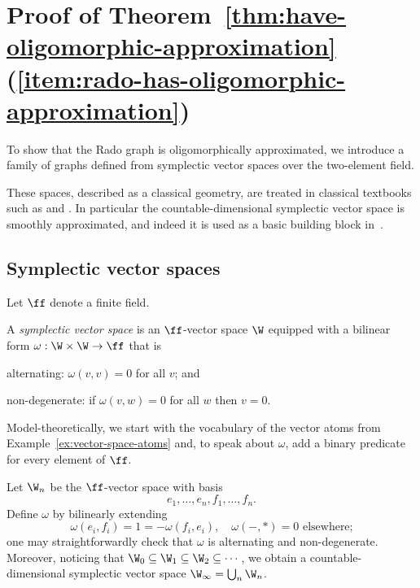 
\section{Proof of Theorem~\ref{thm:have-oligomorphic-approximation}(\ref{item:rado-has-oligomorphic-approximation})}\label{sec:appendix-symplectic}
To show that the Rado graph is oligomorphically approximated, we introduce a family of graphs defined from symplectic vector spaces over the two-element field.

These spaces, described as a classical geometry, are treated in classical textbooks such as \cite[pp.~114--121]{Artin_symplectic} and \cite[pp.~75--83]{Aschbacher_symplectic}.
In particular the countable-dimensional symplectic vector space is smoothly approximated, and indeed it is used as a basic building block in~\cite{KLM89}.


\subsection{Symplectic vector spaces}
Let $\ff$ denote a finite field.
\begin{definition}
    A \emph{symplectic vector space} is an $\ff$-vector space $\W$ 
    equipped with a bilinear form $\omega: \W \times \W \to \ff$ that is
    \begin{bracketenumerate}
        \item alternating: $\omega(v, v) = 0$ for all $v$; and
        \item non-degenerate: if $\omega(v, w) = 0$ for all $w$ then $v = 0$.
    \end{bracketenumerate}    
    Model-theoretically, we start with the vocabulary of the vector atoms from Example~\ref{ex:vector-space-atoms} 
    and, to speak about $\omega$, add a binary predicate for every element of $\ff$.
\end{definition}



\begin{example}
    Let $\W_n$ be the $\ff$-vector space with basis \[e_1  , \ldots, e_n, f_1, \ldots, f_n.\]
    Define $\omega$ by bilinearly extending
    \begin{equation}\label{eq:symplectic-basis}
        \omega(e_i, f_i) = 1 = -\omega(f_i, e_i),\quad
        \omega(-, *) = 0 \text{ elsewhere;}
        \tag{$\ddagger$}
    \end{equation}
    one may straightforwardly check that $\omega$ is alternating and non-degenerate.
    Moreover, noticing that $\W_0 \subseteq \W_1 \subseteq \W_2 \subseteq \cdots$,
    we obtain a countable-dimensional symplectic vector space $\W_\infty = \bigcup_n \W_n$.
\lipicsEnd\end{example}

